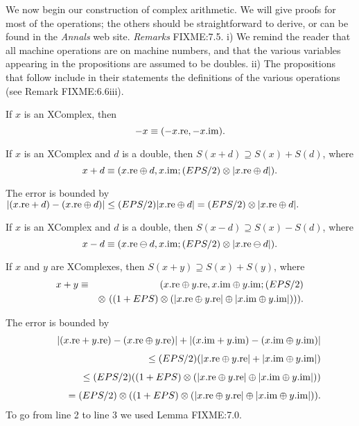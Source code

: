 We now begin our construction of complex arithmetic. We will give proofs for most of the operations; the others should be straightforward to derive,
or can be found in the {\it Annals} web site.
{\it Remarks} FIXME:7.5.
i) We remind the reader that all machine operations are on machine numbers, and that the various variables appearing in the propositions are assumed to be doubles.
ii) The propositions that follow include in their statements the definitions of the various operations (see Remark FIXME:6.6iii).

If $x$ is an {\rm XComplex,} then 
$$-x \equiv (-x.{\rm re},-x.{\rm im}).$$ 
\endproclaim

If $x$ is an {\rm XComplex} and $d$ is a double{\rm ,} then 
$S(x + d) \supseteq S(x) + S(d)${\rm ,} where 
 $$x + d \equiv (x.{\rm re} \oplus d, x.{\rm im};
(EPS/2)\otimes |x.{\rm re} \oplus d|).$$
\endproclaim

The  error is bounded by  
\hfill ${\displaystyle |(x.{\rm re} + d) - (x.{\rm re} \oplus d)|
\le (EPS/2) | x.{\rm re} \oplus d|
  =  (EPS/2) \otimes | x.{\rm re} \oplus d|.}$ \enddemo

If $x$ is an {\rm XComplex} and $d$ is a double{\rm ,} then 
$S(x - d) \supseteq S(x) - S(d)${\rm ,} where 
 $$x - d \equiv (x.{\rm re} \ominus d, x.{\rm im};
(EPS/2)\otimes |x.{\rm re} \ominus d|).$$ \endproclaim

If $x$ and $y$ are {\rm XComplexes,} then 
$S(x + y) \supseteq S(x) + S(y)${\rm ,} where
 \begin{eqnarray*}
x + y &\equiv& (x.{\rm re} \oplus y.{\rm re}, x.{\rm im} \oplus y.{\rm im};
(EPS/2)\\
&&  \otimes\ ((1 + EPS)  \otimes (|x.{\rm re} \oplus y.{\rm re}| \oplus |x.{\rm im} \oplus y.{\rm im}|))).
\end{eqnarray*}
\endproclaim
  

The error is bounded by
\begin{eqnarray*}
&&|(x.{\rm re} + y.{\rm re}) - (x.{\rm re} \oplus y.{\rm re})| + 
  |(x.{\rm im} + y.{\rm im}) - (x.{\rm im} \oplus y.{\rm im})|\\[4pt]
&&\qquad \le (EPS/2)(| x.{\rm re} \oplus y.{\rm re}| + 
   |x.{\rm im} \oplus y.{\rm im}|)\\[4pt]
&&\qquad \le (EPS/2)((1 + EPS) \otimes (| x.{\rm re} \oplus y.{\rm re}| \oplus 
   |x.{\rm im} \oplus y.{\rm im}|))\\[4pt]
&&\qquad = (EPS/2) \otimes ((1 + EPS) \otimes (| x.{\rm re} \oplus y.{\rm re}| \oplus 
   |x.{\rm im} \oplus y.{\rm im}|)).
\end{eqnarray*}
To go from line 2 to line 3 we used Lemma FIXME:7.0. \enddemo


